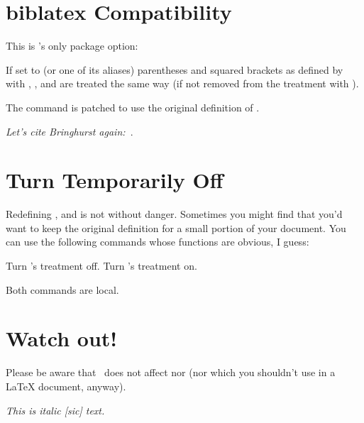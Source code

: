 \documentclass[load-preamble+]{cnltx-doc}
\begin{document}
\section{biblatex Compatibility}
This is \embrac's only package option:
\begin{options}
    If set to  (or one of its aliases) parentheses and squared
    brackets as defined by  with ,
    ,  and  are
    treated the same way (if not removed from the treatment with ).
   
    The command  is patched to use the original definition
    of .
\end{options}

\begin{example}
  \emph{Let's cite Bringhurst again:~\cite{bringhurst04}}.
\end{example}

\section{Turn \embrac Temporarily Off}
Redefining ,  and  is not without danger.
Sometimes you might find that you'd want to keep the original definition for a
small portion of your document.  You can use the following commands whose
functions are obvious, I guess:
\begin{commands}
    Turn \embrac's treatment off.
    Turn \embrac's treatment on.
\end{commands}
Both commands are local.

\section{Watch out!}
Please be aware that \embrac\ does not affect  nor  (nor
 which you shouldn't use in a \LaTeX{} document, anyway).
\begin{example}
  \itshape This is italic [sic] text.
\end{example}
\end{document}
